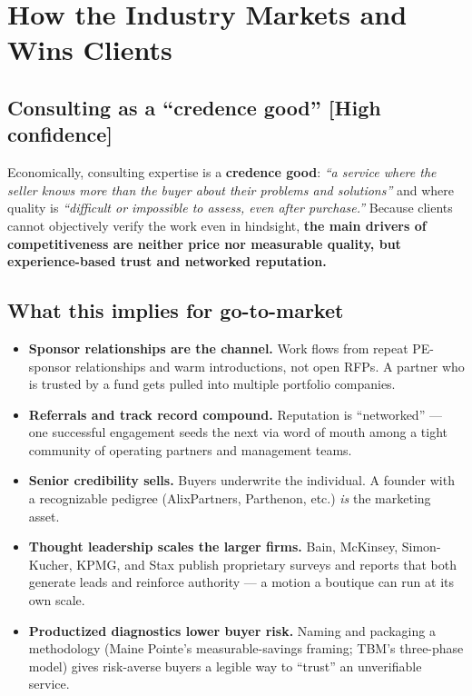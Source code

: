 \documentclass[11pt]{article}
\newcommand{\high}{\textcolor{green!45!black}{\textbf{[High confidence]}}}
\begin{document}
\section{How the Industry Markets and Wins Clients}

\subsection{Consulting as a ``credence good'' \high}
Economically, consulting expertise is a \textbf{credence good}: \emph{``a service
where the seller knows more than the buyer about their problems and
solutions''} and where quality is \emph{``difficult or impossible to assess,
even after purchase.''} Because clients cannot objectively verify the work even
in hindsight, \textbf{the main drivers of competitiveness are neither price nor
measurable quality, but experience-based trust and networked reputation.}

\subsection{What this implies for go-to-market}
\begin{itemize}
  \item \textbf{Sponsor relationships are the channel.} Work flows from repeat
  PE-sponsor relationships and warm introductions, not open RFPs. A partner who
  is trusted by a fund gets pulled into multiple portfolio companies.
  \item \textbf{Referrals and track record compound.} Reputation is
  ``networked'' --- one successful engagement seeds the next via word of mouth
  among a tight community of operating partners and management teams.
  \item \textbf{Senior credibility sells.} Buyers underwrite the individual.
  A founder with a recognizable pedigree (AlixPartners, Parthenon, etc.) \emph{is}
  the marketing asset.
  \item \textbf{Thought leadership scales the larger firms.} Bain, McKinsey,
  Simon-Kucher, KPMG, and Stax publish proprietary surveys and reports that
  both generate leads and reinforce authority --- a motion a boutique can run at
  its own scale.
  \item \textbf{Productized diagnostics lower buyer risk.} Naming and packaging a
  methodology (Maine Pointe's measurable-savings framing; TBM's three-phase
  model) gives risk-averse buyers a legible way to ``trust'' an unverifiable
  service.
\end{itemize}
\end{document}
